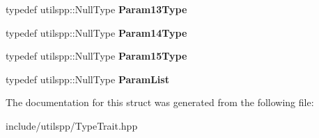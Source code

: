 \begin{DoxyCompactItemize}
\item 
\hypertarget{structutilspp_1_1PointerOnMemberFunction_3_01W_07V_1_1_5_08_07_08_4_a81cefbe932dc3c16a1f71d08326ba576}{typedef utilspp\-::\-Null\-Type {\bfseries Param13\-Type}}\label{structutilspp_1_1PointerOnMemberFunction_3_01W_07V_1_1_5_08_07_08_4_a81cefbe932dc3c16a1f71d08326ba576}

\item 
\hypertarget{structutilspp_1_1PointerOnMemberFunction_3_01W_07V_1_1_5_08_07_08_4_a67d4cc3a2472ba112d03e2fc5b5df927}{typedef utilspp\-::\-Null\-Type {\bfseries Param14\-Type}}\label{structutilspp_1_1PointerOnMemberFunction_3_01W_07V_1_1_5_08_07_08_4_a67d4cc3a2472ba112d03e2fc5b5df927}

\item 
\hypertarget{structutilspp_1_1PointerOnMemberFunction_3_01W_07V_1_1_5_08_07_08_4_ae6d3e3242516491c3e6b15c8c3fe5d82}{typedef utilspp\-::\-Null\-Type {\bfseries Param15\-Type}}\label{structutilspp_1_1PointerOnMemberFunction_3_01W_07V_1_1_5_08_07_08_4_ae6d3e3242516491c3e6b15c8c3fe5d82}

\item 
\hypertarget{structutilspp_1_1PointerOnMemberFunction_3_01W_07V_1_1_5_08_07_08_4_a4c5d906a12a12ad780bd4d4527a9d2b3}{typedef utilspp\-::\-Null\-Type {\bfseries Param\-List}}\label{structutilspp_1_1PointerOnMemberFunction_3_01W_07V_1_1_5_08_07_08_4_a4c5d906a12a12ad780bd4d4527a9d2b3}

\end{DoxyCompactItemize}


The documentation for this struct was generated from the following file\-:\begin{DoxyCompactItemize}
\item 
include/utilspp/Type\-Trait.\-hpp\end{DoxyCompactItemize}

